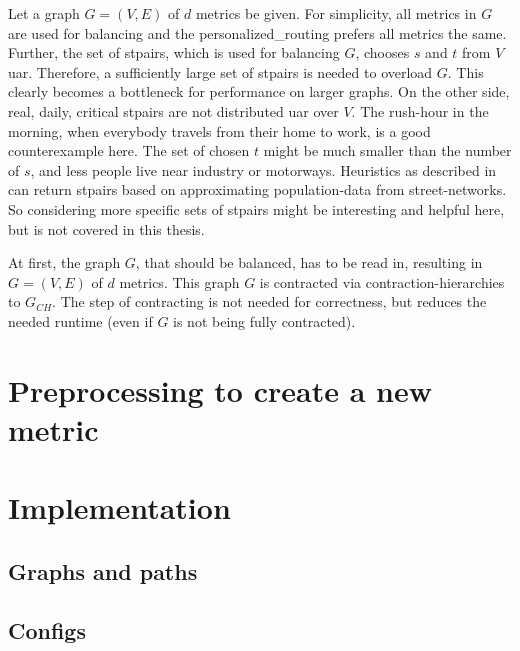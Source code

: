     Let a graph $G = (V, E)$ of $d$ \glspl{metric} be given.
    For simplicity, all \glspl{metric} in $G$ are used for balancing and the \gls{personalized_routing} prefers all \glspl{metric} the same.
    Further, the set of \glspl{stpair}, which is used for balancing $G$, chooses $s$ and $t$ from $V$ \gls{uar}.
    Therefore, a sufficiently large set of \glspl{stpair} is needed to overload $G$.
    This clearly becomes a bottleneck for performance on larger graphs.
    On the other side, real, daily, critical \glspl{stpair} are not distributed \gls{uar} over $V$.
    The rush-hour in the morning, when everybody travels from their home to work, is a good counterexample here.
    The set of chosen $t$ might be much smaller than the number of $s$, and less people live near industry or motorways.
    Heuristics as described in~\cite{bakillah:population_from_osm} can return \glspl{stpair} based on approximating population-data from street-networks.
    So considering more specific sets of \glspl{stpair} might be interesting and helpful here, but is not covered in this thesis.

    At first, the graph $G$, that should be balanced, has to be read in, resulting in $G = (V, E)$ of $d$ \glspl{metric}.
    This graph $G$ is contracted via \gls{contraction-hierarchies} to $G_{CH}$.
    The step of contracting is not needed for correctness, but reduces the needed runtime (even if $G$ is not being fully contracted).

\section{Preprocessing to create a new metric}


\section{Implementation}
\label{chap:balancing:implementation}


    \subsection{Graphs and paths}



    \subsection{Configs}

